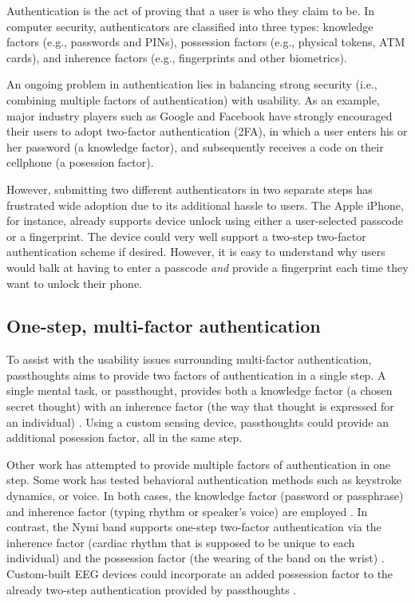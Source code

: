 \documentclass[sigconf]{acmart}
\begin{document}
Authentication is the act of proving that a user is who they claim to be.
In computer security, authenticators are classified into three types: knowledge factors (e.g., passwords
and PINs), possession factors (e.g., physical tokens, ATM cards), and inherence
factors (e.g., fingerprints and other biometrics). 

An ongoing problem in authentication lies in balancing strong security
(i.e., combining multiple factors of authentication)
with usability.
As an example, major industry players such as Google and
Facebook have strongly encouraged their users to adopt two-factor
authentication (2FA), in which a user enters his or her password (a knowledge factor),
and subsequently receives a code on their cellphone (a posession factor).

However, submitting two different 
authenticators in two separate steps has frustrated wide adoption
due to its additional hassle to users. The Apple iPhone, for instance,
already supports device unlock using either a user-selected passcode or a fingerprint. The
device could very well support a two-step two-factor authentication scheme if
desired. However, it is easy to understand why users would balk at having to
enter a passcode \emph{and} provide a fingerprint each time they want to unlock their phone.

\subsection{One-step, multi-factor authentication}
\label{sec:orga03c0d1}

To assist with the usability issues surrounding multi-factor authentication,
passthoughts aims to provide two factors of authentication in a single step.
A single mental task, or passthought, provides both a knowledge factor (a chosen secret thought)
with an inherence factor (the way that thought is expressed for an individual) \cite{Chuang2013b,Johnson2014}.
Using a custom sensing device, passthoughts could provide an additional posession factor, all in the same step.

Other work has attempted to provide multiple factors of authentication in one step.
Some work has tested behavioral authentication methods such as keystroke dynamics, or voice. In both cases, the knowledge factor (password or passphrase) and
inherence factor (typing rhythm or speaker's voice) are employed \cite{Monrose1997}.
In contrast, the Nymi band supports one-step two-factor authentication via the inherence
factor (cardiac rhythm that is supposed to be unique to each individual) and the
possession factor (the wearing of the band on the wrist) \cite{Nymi}.
Custom-built EEG devices could incorporate an added possession factor 
to the already two-step authentication provided by passthoughts \cite{Curran2017}.
\end{document}

